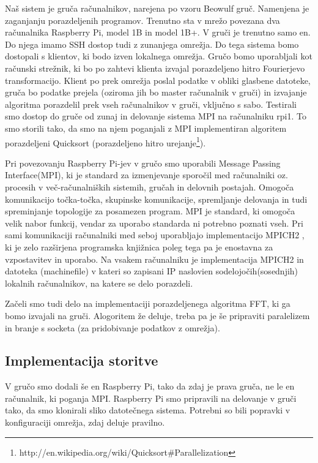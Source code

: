 \documentclass[11pt]{article}
\begin{document}
Naš sistem je gruča računalnikov, narejena po vzoru Beowulf gruč. Namenjena je zaganjanju porazdeljenih programov. Trenutno sta v mrežo povezana dva računalnika Raspberry Pi, model 1B in model 1B+. V gruči je trenutno samo en. Do njega imamo SSH dostop tudi z zunanjega omrežja.
Do tega sistema bomo dostopali s klientov, ki bodo izven lokalnega omrežja. Gručo bomo uporabljali kot računski strežnik, ki bo po zahtevi klienta izvajal porazdeljeno hitro Fourierjevo transformacijo. Klient po prek omrežja poslal podatke v obliki glasbene datoteke, gruča bo podatke prejela (oziroma jih bo master računalnik v gruči) in izvajanje algoritma porazdelil prek vseh računalnikov v gruči, vključno s sabo.
Testirali smo dostop do gruče od zunaj in delovanje sistema MPI na računalniku rpi1. To smo storili tako, da smo na njem poganjali z MPI implementiran algoritem porazdeljeni Quicksort (porazdeljeno hitro urejanje\footnote{http://en.wikipedia.org/wiki/Quicksort\#Parallelization}).

Pri povezovanju Raspberry Pi-jev v gručo smo uporabili Message Passing Interface(MPI), ki je standard za izmenjevanje sporočil med računalniki oz. procesih v več-računalniških sistemih, gručah in delovnih postajah. Omogoča komunikacijo točka-točka, skupinske komunikacije, spremljanje delovanja in tudi spreminjanje topologije za posamezen program. MPI je standard, ki omogoča velik nabor funkcij, vendar za uporabo standarda ni potrebno poznati vseh. Pri sami komunikaciji računalniki med seboj uporabljajo implementacijo MPICH2 \cite{Mpich},
ki je zelo razširjena programska knjižnica poleg tega pa je enostavna za vzpostavitev in uporabo. Na vsakem računalniku je implementacija 
MPICH2 in datoteka (machinefile)\cite{Gruca} v kateri so zapisani IP naslovien sodelojočih(sosednjih) lokalnih računalnikov, na katere se delo porazdeli.

Začeli smo tudi delo na implementaciji porazdeljenega algoritma FFT, ki ga bomo izvajali na gruči. Alogoritem že deluje, treba pa je še pripraviti paralelizem in branje s socketa (za pridobivanje podatkov z omrežja).

\subsection{Implementacija storitve}
V gručo smo dodali še en Raspberry Pi, tako da zdaj je prava gruča, ne le en računalnik, ki poganja MPI. Raspberry Pi smo pripravili na delovanje v gruči tako, da smo klonirali sliko datotečnega sistema. Potrebni so bili popravki v konfiguraciji omrežja, zdaj deluje pravilno.
\end{document}
